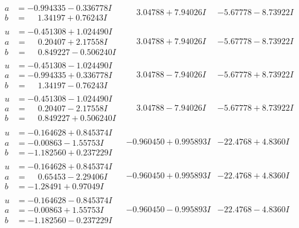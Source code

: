 \documentclass[1p]{elsarticle_modified}
\theoremstyle{definition}
\begin{document}
$$\begin{array}{c|c|c}
\begin{aligned}
a &= -0.994335 - 0.336778 I \\
b &= \phantom{-}1.34197 + 0.76243 I\end{aligned}
 & \phantom{-}3.04788 + 7.94026 I & -5.67778 - 8.73922 I \\ \hline\begin{aligned}
u &= -0.451308 + 1.024490 I \\
a &= \phantom{-}0.20407 + 2.17558 I \\
b &= \phantom{-}0.849227 - 0.506240 I\end{aligned}
 & \phantom{-}3.04788 + 7.94026 I & -5.67778 - 8.73922 I \\ \hline\begin{aligned}
u &= -0.451308 - 1.024490 I \\
a &= -0.994335 + 0.336778 I \\
b &= \phantom{-}1.34197 - 0.76243 I\end{aligned}
 & \phantom{-}3.04788 - 7.94026 I & -5.67778 + 8.73922 I \\ \hline\begin{aligned}
u &= -0.451308 - 1.024490 I \\
a &= \phantom{-}0.20407 - 2.17558 I \\
b &= \phantom{-}0.849227 + 0.506240 I\end{aligned}
 & \phantom{-}3.04788 - 7.94026 I & -5.67778 + 8.73922 I \\ \hline\begin{aligned}
u &= -0.164628 + 0.845374 I \\
a &= -0.00863 - 1.55753 I \\
b &= -1.182560 + 0.237229 I\end{aligned}
 & -0.960450 + 0.995893 I & -22.4768 + 4.8360 I \\ \hline\begin{aligned}
u &= -0.164628 + 0.845374 I \\
a &= \phantom{-}0.65453 - 2.29406 I \\
b &= -1.28491 + 0.97049 I\end{aligned}
 & -0.960450 + 0.995893 I & -22.4768 + 4.8360 I \\ \hline\begin{aligned}
u &= -0.164628 - 0.845374 I \\
a &= -0.00863 + 1.55753 I \\
b &= -1.182560 - 0.237229 I\end{aligned}
 & -0.960450 - 0.995893 I & -22.4768 - 4.8360 I \\ \hline\begin{aligned}

\end{aligned}
\end{array}$$
\end{document}
